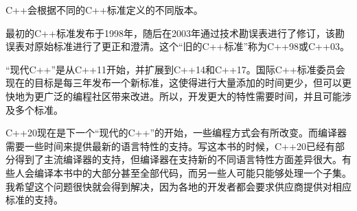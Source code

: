 
C++会根据不同的C++标准定义的不同版本。

最初的C++标准发布于1998年，随后在2003年通过技术勘误表进行了修订，该勘误表对原始标准进行了更正和澄清。这个“旧的C++标准”称为C++98或C++03。

“现代C++”是从C++11开始，并扩展到C++14和C++17。国际C++标准委员会现在的目标是每三年发布一个新标准，这使得进行大量添加的时间更少，但可以更快地为更广泛的编程社区带来改进。所以，开发更大的特性需要时间，并且可能涉及多个标准。

C++20现在是下一个“现代的C++”的开始，一些编程方式会有所改变。而编译器需要一些时间来提供最新的语言特性的支持。写这本书的时候，C++20已经有部分得到了主流编译器的支持，但编译器在支持新的不同语言特性方面差异很大。有些人会编译本书中的大部分甚至全部代码，而另一些人可能只能够处理一个子集。我希望这个问题很快就会得到解决，因为各地的开发者都会要求供应商提供对相应标准的支持。